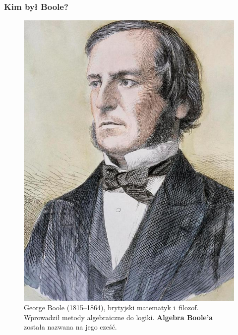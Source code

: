 \documentclass[10pt,t]{beamer}
\begin{document}
\begin{frame}
  \frametitle{Kim był Boole?}


  \begin{figure}

    \centering

    \includegraphics[scale=0.195]
    {./Presentations-pictures/George-Boole.jpeg}

    \caption{George Boole (1815--1864), brytyjski matematyk i~filozof.
      Wprowadził metody algebraiczne do logiki. \textbf{Algebra Boole’a}
    została nazwana na jego cześć.}

    \label{fig:George-Boole}

  \end{figure}

\end{frame}
\end{document}
